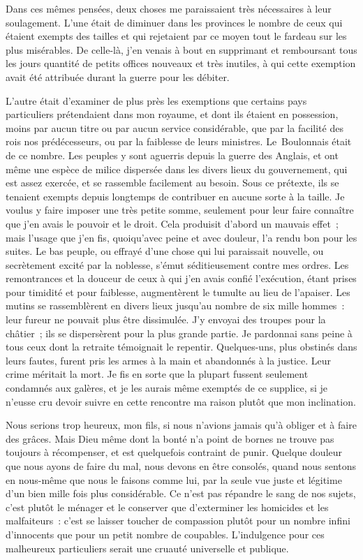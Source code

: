 \documentclass[french,twoside]{book} %
\begin{document}
Dans ces mêmes pensées, deux choses me paraissaient très nécessaires à leur soulagement. L’une était de diminuer dans les provinces le nombre de ceux qui étaient exempts des tailles et qui rejetaient par ce moyen tout le fardeau sur les plus misérables. De celle-là, j’en venais à bout en supprimant et remboursant tous les jours quantité de petits offices nouveaux et très inutiles, à qui cette exemption avait été attribuée durant la guerre pour les débiter.\par
L’autre était d’examiner de plus près les exemptions que certains pays particuliers prétendaient dans mon royaume, et dont ils étaient en possession, moins par aucun titre ou par aucun service considérable, que par la facilité des rois nos prédécesseurs, ou par la faiblesse de leurs ministres. Le Boulonnais était de ce nombre. Les peuples y sont aguerris depuis la guerre des Anglais, et ont même une espèce de milice dispersée dans les divers lieux du gouvernement, qui est assez exercée, et se rassemble facilement au besoin. Sous ce prétexte, ils se tenaient exempts depuis longtemps de contribuer en aucune sorte à la taille. Je voulus y faire imposer une très petite somme, seulement pour leur faire connaître que j’en avais le pouvoir et le droit. Cela produisit d’abord un mauvais effet ; mais l’usage que j’en fis, quoiqu’avec peine et avec douleur, l’a rendu bon pour les suites. Le bas peuple, ou effrayé d’une chose qui lui paraissait nouvelle, ou secrètement excité par la noblesse, s’émut séditieusement contre mes ordres. Les remontrances et la douceur de ceux à qui j’en avais confié l’exécution, étant prises pour timidité et pour faiblesse, augmentèrent le tumulte au lieu de l’apaiser. Les mutins se rassemblèrent en divers lieux jusqu’au nombre de six mille hommes : leur fureur ne pouvait plus être dissimulée. J’y envoyai des troupes pour la châtier ; ils se dispersèrent pour la plus grande partie. Je pardonnai sans peine à tous ceux dont la retraite témoignait le repentir. Quelques-uns, plus obstinés dans leurs fautes, furent pris les armes à la main et abandonnés à la justice. Leur crime méritait la mort. Je fis en sorte que la plupart fussent seulement condamnés aux galères, et je les aurais même exemptés de ce supplice, si je n’eusse cru devoir suivre en cette rencontre ma raison plutôt que mon inclination.\par
Nous serions trop heureux, mon fils, si nous n’avions jamais qu’à obliger et à faire des grâces. Mais Dieu même dont la bonté n’a point de bornes ne trouve pas toujours à récompenser, et est quelquefois contraint de punir. Quelque douleur que nous ayons de faire du mal, nous devons en être consolés, quand nous sentons en nous-même que nous le faisons comme lui, par la seule vue juste et légitime d’un bien mille fois plus considérable. Ce n’est pas répandre le sang de nos sujets, c’est plutôt le ménager et le conserver que d’exterminer les homicides et les malfaiteurs : c’est se laisser toucher de compassion plutôt pour un nombre infini d’innocents que pour un petit nombre de coupables. L’indulgence pour ces malheureux particuliers serait une cruauté universelle et publique.\par
\end{document}

